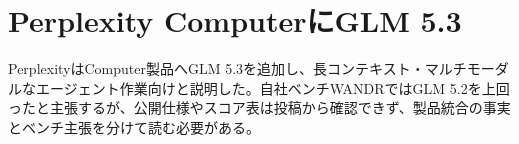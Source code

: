 \section{Perplexity ComputerにGLM 5.3}
PerplexityはComputer製品へGLM 5.3を追加し、長コンテキスト・マルチモーダルなエージェント作業向けと説明した。自社ベンチWANDRではGLM 5.2を上回ったと主張するが、公開仕様やスコア表は投稿から確認できず、製品統合の事実とベンチ主張を分けて読む必要がある。
